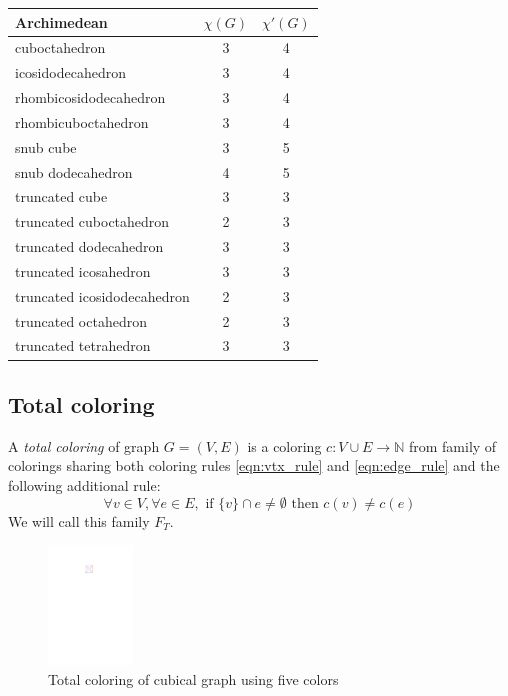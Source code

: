 \begin{center}
\begin{tabular}{|l|c|c|}
\hline
Archimedean & $\chi(G)$ & $\chi'(G)$ \\
\hline\hline
cuboctahedron & 3 & 4 \\
\hline
icosidodecahedron & 3 & 4 \\
\hline
rhombicosidodecahedron & 3 & 4 \\
\hline
rhombicuboctahedron & 3 & 4 \\
\hline
snub cube & 3 & 5 \\
\hline
snub dodecahedron & 4 & 5 \\
\hline
truncated cube & 3 & 3 \\
\hline
truncated cuboctahedron & 2 & 3 \\
\hline
truncated dodecahedron & 3 & 3 \\
\hline
truncated icosahedron & 3 & 3 \\
\hline
truncated icosidodecahedron & 2 & 3 \\
\hline
truncated octahedron & 2 & 3 \\
\hline
truncated tetrahedron & 3 & 3 \\
\hline
\end{tabular}
\end{center}


\subsection{Total coloring}

\begin{definition}
    A \textit{total coloring} of graph $G=(V,E)$ is a coloring $c: V \cup E \rightarrow \mathbb{N}$ from family of colorings sharing both coloring rules \ref{eqn:vtx_rule} and \ref{eqn:edge_rule} and the following additional rule: 
    \begin{equation}\label{eqn:tot_rule}
    \forall v \in V,  \forall e \in E, \text{ if } \{v\} \cap e \neq \emptyset \text{ then } c(v) \neq c(e) \tag{$R_T$}
    \end{equation}
    We will call this family $F_T$.
\end{definition}

\begin{figure}[H]
    \centering
    \includegraphics[width=0.2\textwidth]{../Resources/Figs/cubical_tot_colr.pdf}
    \caption{Total coloring of cubical graph using five colors}
    \label{fig:cubical_tot_coloring}
\end{figure}

